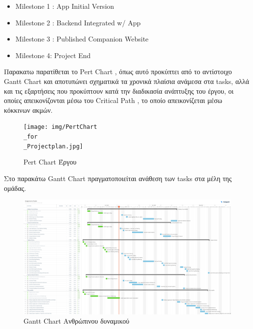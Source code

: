 \documentclass{../ol-softwaremanual}
\begin{document}
	\begin{itemize}
		\item \en Milestone 1 : App Initial Version
		\item \en Milestone 2 : Backend Integrated w/ App
		\item \en Milestone 3 : Published Companion Website
		\item \en Milestone 4: Project End
	\end{itemize}
	
	
	\newpage 
	
	\flushleft
	Παρακατω παρατίθεται το \en Pert Chart \gr, όπως αυτό προκύπτει από το αντίστοιχο \en Gantt Chart \gr και αποτυπώνει σχηματικά τα χρονικά πλαίσια ανάμεσα στα \en tasks\gr, αλλά και τις εξαρτήσεις που προκύπτουν κατά την διαδικασία ανάπτυξης του έργου, οι οποίες απεικονίζονται μέσω του \en Critical Path \gr, το οποίο απεικονίζεται μέσω κόκκινων ακμών.
	
	
	\begin{figure}[htbp!]
		
		\texttt{[image: img/PertChart\\\_for\\\_Projectplan.jpg]}
		\caption{ \en Pert Chart \gr Έργου}
	\end{figure}
	
	\newpage
	
	\vspace{20pt}
	\flushleft
	Στο παρακάτω \en Gantt Chart \gr πραγματοποιείται ανάθεση των \en tasks \gr στα μέλη της ομάδας.
	
	\begin{figure}[htbp!]
		
		\includegraphics[width=\textwidth, height=\textheight, keepaspectratio ]{img/Ανάθεση_εργασιών.jpg}
		\caption{ \en Gantt Chart \gr Ανθρώπινου δυναμικού}
	\end{figure}
	
\end{document}
